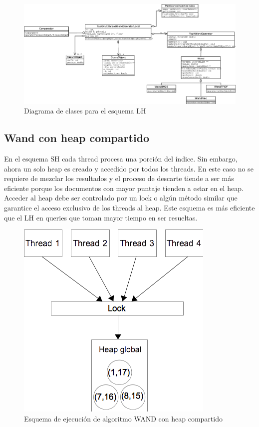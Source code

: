 \begin{figure}[H]
\centering
\includegraphics[scale=.75]{images/TopKMultiThreadWandOperatorLocal.png}
\caption{Diagrama de clases para el esquema LH}
\label{fig:TopKMultiThreadWandOperatorLocal}
\end{figure}


\subsection{Wand con heap compartido}
\label{scheduling:whc}
En el esquema SH cada thread procesa una porción del índice. Sin embargo, ahora un solo heap es creado y accedido por todos los threads. En este caso no se requiere de mezclar los resultados y el proceso de descarte tiende a ser más eficiente porque los documentos con mayor puntaje tienden a estar en el heap. Acceder al heap debe ser controlado por un lock o algún método similar que garantice el acceso exclusivo de los threads al heap. Este esquema es más eficiente que el LH en queries que toman mayor tiempo en ser resueltas.

\begin{figure}[H]
\centering
\includegraphics[scale=.75]{images/wand-heap-compartido.png}
\caption{Esquema de ejecución de algoritmo WAND con heap compartido}
\label{fig:wand-heap-compartido}
\end{figure}

